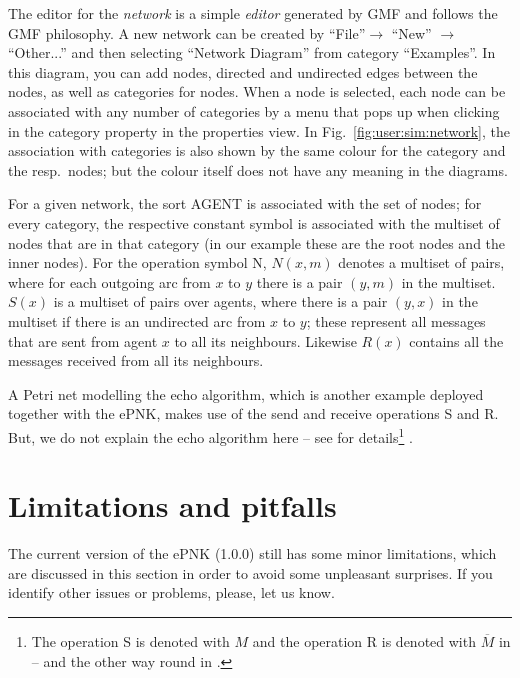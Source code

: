 The editor for the \emph{network}%
is a simple \emph{editor} generated by GMF
and follows the GMF philosophy. A new network can be created by
``File''$\rightarrow$ ``New''  $\rightarrow$ ``Other...'' and then
selecting ``Network Diagram'' from category ``Examples''. In this
diagram, you can add nodes, directed and undirected edges between the
nodes, as well as categories for nodes. When a node is selected,
each node can be associated with any number of categories by
a menu that pops up when clicking in the category property in
the properties view. In Fig.~\ref{fig:user:sim:network}, the
association with categories is also shown by the same colour for
the category and the resp.\ nodes; but the colour itself does not have
any meaning in the diagrams.

For a given network, the sort {\sf AGENT} is associated with
the set of nodes; for every category, the respective constant
symbol is associated with the multiset of nodes that are in
that category (in our example these are the root nodes and
the inner nodes). For the operation symbol {\sf N}, 
$N(x,m)$ denotes a multiset of pairs, where for each outgoing
arc from $x$ to $y$ there is a pair $(y,m)$ in the multiset.
$S(x)$ is a multiset of pairs over agents, where there
is a pair $(y,x)$ in the multiset if there is an undirected
arc from $x$ to $y$; these represent all messages that are
sent from agent $x$ to all its neighbours. Likewise $R(x)$ contains
all the messages received from all its neighbours. 

A Petri net modelling the echo algorithm,%
which is another example deployed together with the ePNK, makes use of the send
and receive operations {\sf S} and {\sf R}. But, we do not explain the echo
algorithm here -- see \cite{WWea97, KRVW97} for details\footnote
  {The operation {\sf S} is denoted with $M$ and the
   operation {\sf R} is denoted with $\overline{M}$ in \cite{KRVW97} -- and
   the other way round in \cite{WWea97}.}%
.%

\section{Limitations and pitfalls}  

The current version of the ePNK (1.0.0) still has some minor limitations,
which are discussed in this section in order to avoid some unpleasant
surprises. If you identify other issues or problems, please, let us know. 
  
